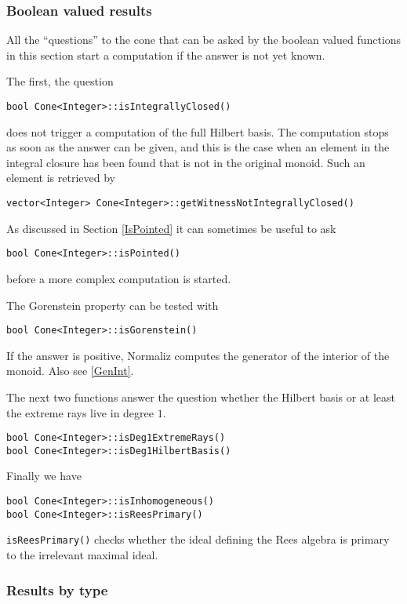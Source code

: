 \documentclass[12pt,a4paper]{scrartcl}
\theoremstyle{definition}
\begin{document}
\begin{small}
\subsubsection{Boolean valued results}

All the ``questions'' to the cone that can be asked by the boolean valued functions in this section start a computation if the answer is not yet known.

The first, the question
\begin{Verbatim}
bool Cone<Integer>::isIntegrallyClosed()
\end{Verbatim}
does not trigger a computation of the full Hilbert basis. The computation stops as soon as the answer can be given, and this is the case when an element in the integral closure has been found that is not in the original monoid. Such an element is retrieved by
\begin{Verbatim}
vector<Integer> Cone<Integer>::getWitnessNotIntegrallyClosed()
\end{Verbatim}

As discussed in Section \ref{IsPointed} it can sometimes be useful to ask
\begin{Verbatim}
bool Cone<Integer>::isPointed()
\end{Verbatim}
before a more complex computation is started.

The Gorenstein property can be tested with
\begin{Verbatim}
bool Cone<Integer>::isGorenstein()
\end{Verbatim}
If the answer is positive, Normaliz computes the generator of the interior of the monoid. Also see \ref{GenInt}.


The next two functions answer the question whether the Hilbert basis or at least the extreme rays live in degree $1$.
\begin{Verbatim}
bool Cone<Integer>::isDeg1ExtremeRays()
bool Cone<Integer>::isDeg1HilbertBasis()
\end{Verbatim}

Finally we have
\begin{Verbatim}
bool Cone<Integer>::isInhomogeneous()
bool Cone<Integer>::isReesPrimary()
\end{Verbatim}
\verb|isReesPrimary()| checks whether the ideal defining the Rees algebra is primary to the irrelevant maximal ideal.


\subsubsection{Results by type}\label{ByType}


\end{small}
\end{document}
